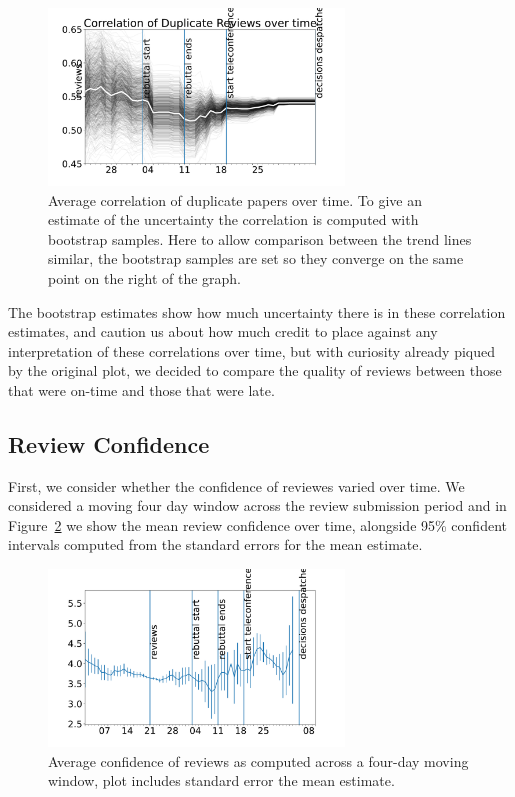 \begin{figure}[htb]
\centering
\includegraphics[width=0.70\textwidth]{diagrams/neurips/correlation-duplicate-reviews-bootstrap.pdf}


\caption{Average correlation of duplicate papers over time. To give an estimate of the uncertainty the correlation is computed with bootstrap samples. Here to allow comparison between the trend lines similar, the bootstrap samples are set so they converge on the same point on the right of the graph.}
\label{correlation-duplicate-reviews-bootstrap}
\end{figure}

The bootstrap estimates show how much uncertainty there is in these correlation estimates, and caution us about how much credit to place against any interpretation of these correlations over time, but with curiosity already piqued by the original plot, we decided to compare the quality of reviews between those that were on-time and those that were late.

\subsection{Review Confidence}\label{review-confidence}

First, we consider whether the confidence of reviewes varied over time. We considered a moving four day window across the review submission period and in Figure~\ref{review-confidence-time} we show the mean review confidence over time, alongside 95\% confident intervals computed from the standard errors for the mean estimate. 

\begin{figure}[htb]
\centering
\includegraphics[width=0.70\textwidth]{diagrams/neurips/review-confidence-time.pdf}


\caption{Average confidence of reviews as computed across a four-day moving window, plot includes standard error the mean estimate.}
\label{review-confidence-time}
\end{figure}

